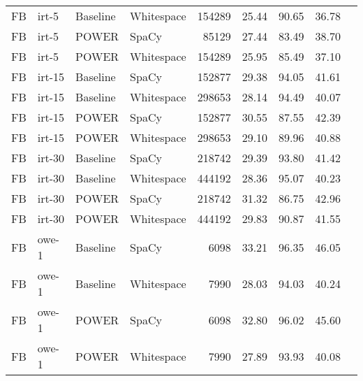 \begin{tabular}{| l | l | l | l | r | r | r | r | r |}
    FB & irt-5 & Baseline & Whitespace & \num{154289} &
    25.44 & 90.65 & 36.78 \\

    FB & irt-5 & POWER & SpaCy & \num{85129} & 
    27.44 & 83.49 & 38.70 \\

    FB & irt-5 & POWER & Whitespace & \num{154289} &
    25.95 & 85.49 & 37.10 \\

    \hline

    FB & irt-15 & Baseline & SpaCy & \num{152877} &
    29.38 & 94.05 & 41.61 \\

    FB & irt-15 & Baseline & Whitespace & \num{298653} &
    28.14 & 94.49 & 40.07 \\

    FB & irt-15 & POWER & SpaCy & \num{152877} & 
    30.55 & 87.55 & 42.39 \\

    FB & irt-15 & POWER & Whitespace & \num{298653} &
    29.10 & 89.96 & 40.88 \\

    \hline

    FB & irt-30 & Baseline & SpaCy & \num{218742} &
    29.39 & 93.80 & 41.42 \\

    FB & irt-30 & Baseline & Whitespace & \num{444192} &
    28.36 & 95.07 & 40.23 \\

    FB & irt-30 & POWER & SpaCy & \num{218742} & 
    31.32 & 86.75 & 42.96 \\

    FB & irt-30 & POWER & Whitespace & \num{444192} &
    29.83 & 90.87 & 41.55 \\

    \hline

    FB & owe-1 & Baseline & SpaCy & \num{6098} &
    33.21 & 96.35 & 46.05 \\

    FB & owe-1 & Baseline & Whitespace & \num{7990} &
    28.03 & 94.03 & 40.24 \\

    FB & owe-1 & POWER & SpaCy & \num{6098} & 
    32.80 & 96.02 & 45.60 \\

    FB & owe-1 & POWER & Whitespace & \num{7990} &
    27.89 & 93.93 & 40.08 \\

    \hline
\end{tabular}

